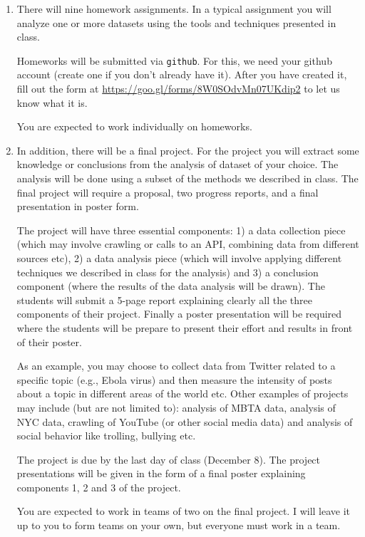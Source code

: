 \documentclass[11pt]{article}
\begin{document}
\begin{enumerate}
\item There will nine homework assignments.  In a typical 
assignment you will 
analyze one or more datasets using the tools and techniques presented in
class.

Homeworks will be submitted via \texttt{github}.   For this, we
  need your github account (create one if you don't already have it).
  After you have created it, fill out the form at
  \url{https://goo.gl/forms/8W0SOdvMn07UKdip2} to let us know what it is.

You are expected to work individually on homeworks.

\item In addition, there will be a final project.  For the project you
  will extract some
knowledge or conclusions from the analysis of dataset of your choice. The analysis
will be done using a subset of the methods we described in class.  The
final project will require a proposal, two progress reports, and a final
presentation in poster form.

The project will have three essential components: 1) a data collection
piece (which may involve crawling or calls to an API, combining data
from different sources etc), 2) a data analysis piece (which will
involve applying different techniques we described in class for the
analysis) and 3) a conclusion component (where the results of the data
analysis will be drawn).  The students will submit a 5-page report
explaining clearly all the three components of their project. Finally a
poster presentation will be required where the students will be prepare
to present their effort and results in front of their poster. 

As an example, you may choose to collect data from Twitter related
to a specific topic (e.g., Ebola virus) and then measure the intensity
of posts about a topic in different areas of the world etc.  Other
examples of projects may include (but are not limited to): analysis of
MBTA data, analysis of NYC data, crawling of YouTube (or other social
media data) and analysis of social behavior like trolling, bullying
etc. 

The project is due by the last day of class (December 8). The project presentations will be
given in the form of a final poster explaining components 1, 2 and 3 of
the project. 

You are expected to work in teams of two on the final project.   I will
leave it up to you to form teams on your own, but everyone must work in
a team.

\end{enumerate}
\end{document}
